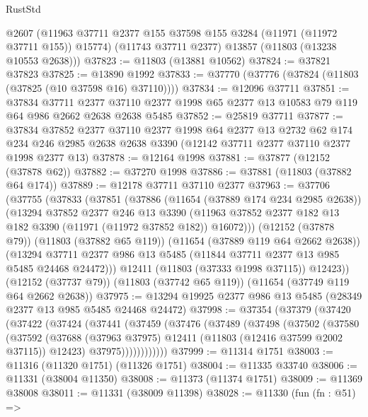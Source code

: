 \begin{lexlean}{RustStd}
\begin{coremodule}
      @2607
      (@11963 @37711 @2377 @155 @37598 @155 @3284 (@11971 (@11972 @37711 @155)) @15774)
      (@11743 @37711 @2377)
      @13857
      (@11803 (@13238 @10553 @2638)))
@37823 := @11803 (@13881 @10562)
@37824 := @37821 @37823
@37825 := @13890 @1992
@37833 := @37770 (@37776 (@37824 (@11803 (@37825 (@10 @37598 @16) @37110))))
@37834 := @12096 @37711
@37851 := @37834
    @37711
    @2377
    @37110
    @2377
    @1998
    @65
    @2377
    @13
    @10583
    @79
    @119
    @64
    @986
    @2662
    @2638
    @2638
    @5485
@37852 := @25819 @37711
@37877 := @37834
    @37852
    @2377
    @37110
    @2377
    @1998
    @64
    @2377
    @13
    @2732
    @62
    @174
    @234
    @246
    @2985
    @2638
    @2638
    @3390
    (@12142 @37711 @2377 @37110 @2377 @1998 @2377 @13)
@37878 := @12164 @1998
@37881 := @37877 (@12152 (@37878 @62))
@37882 := @37270 @1998
@37886 := @37881 (@11803 (@37882 @64 @174))
@37889 := @12178 @37711 @37110 @2377
@37963 := @37706
    (@37755
      (@37833
        (@37851
          (@37886
            (@11654 (@37889 @174 @234 @2985 @2638))
            (@13294
              @37852
              @2377
              @246
              @13
              @3390
              (@11963 @37852 @2377 @182 @13 @182 @3390 (@11971 (@11972 @37852 @182)) @16072)))
          (@12152 (@37878 @79))
          (@11803 (@37882 @65 @119))
          (@11654 (@37889 @119 @64 @2662 @2638))
          (@13294 @37711 @2377 @986 @13 @5485 (@11844 @37711 @2377 @13 @985 @5485 @24468 @24472)))
        @12411
        (@11803 (@37333 @1998 @37115))
        @12423))
    (@12152 (@37737 @79))
    (@11803 (@37742 @65 @119))
    (@11654 (@37749 @119 @64 @2662 @2638))
@37975 := @13294 @19925 @2377 @986 @13 @5485 (@28349 @2377 @13 @985 @5485 @24468 @24472)
@37998 := @37354
    (@37379
      (@37420
        (@37422
          (@37424
            (@37441
              (@37459
                (@37476
                  (@37489
                    (@37498
                      (@37502
                        (@37580
                          (@37592
                            (@37688
                              (@37963 @37975)
                              @12411
                              (@11803 (@12416 @37599 @2002 @37115))
                              @12423)
                            @37975))))))))))))
@37999 := @11314 @1751
@38003 := @11316 (@11320 @1751) (@11326 @1751)
@38004 := @11335 @33740
@38006 := @11331 (@38004 @11350)
@38008 := @11373 (@11374 @1751)
@38009 := @11369 @38008
@38011 := @11331 (@38009 @11398)
@38028 := @11330
    (fun (fn : @51) =>

\end{coremodule}
\end{lexlean}
